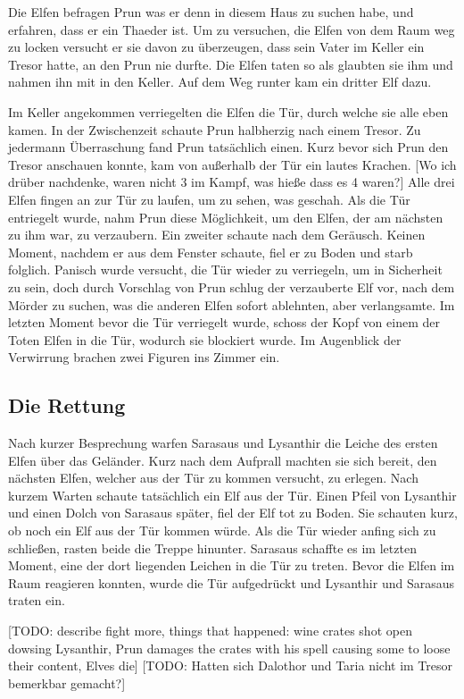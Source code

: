 \documentclass[10pt,twoside,twocolumn,openany]{book}
\begin{document}
	Die Elfen befragen Prun was er denn in diesem Haus zu suchen habe, und erfahren, dass er ein Thaeder ist. Um zu versuchen, die Elfen von dem Raum weg zu locken versucht er sie davon zu überzeugen, dass sein Vater im Keller ein Tresor hatte, an den Prun nie durfte. Die Elfen taten so als glaubten sie ihm und nahmen ihn mit in den Keller. Auf dem Weg runter kam ein dritter Elf dazu.
	
	Im Keller angekommen verriegelten die Elfen die Tür, durch welche sie alle eben kamen. In der Zwischenzeit schaute Prun halbherzig nach einem Tresor. Zu jedermann Überraschung fand Prun tatsächlich einen. Kurz bevor sich Prun den Tresor anschauen konnte, kam von außerhalb der Tür ein lautes Krachen. [Wo ich drüber nachdenke, waren nicht 3 im Kampf, was hieße dass es 4 waren?] Alle drei Elfen fingen an zur Tür zu laufen, um zu sehen, was geschah. Als die Tür entriegelt wurde, nahm Prun diese Möglichkeit, um den Elfen, der am nächsten zu ihm war, zu verzaubern. Ein zweiter schaute nach dem Geräusch. Keinen Moment, nachdem er aus dem Fenster schaute, fiel er zu Boden und starb folglich. Panisch wurde versucht, die Tür wieder zu verriegeln, um in Sicherheit zu sein, doch durch Vorschlag von Prun schlug der verzauberte Elf vor, nach dem Mörder zu suchen, was die anderen Elfen sofort ablehnten, aber verlangsamte. Im letzten Moment bevor die Tür verriegelt wurde, schoss der Kopf von einem der Toten Elfen in die Tür, wodurch sie blockiert wurde. Im Augenblick der Verwirrung brachen zwei Figuren ins Zimmer ein.
	
	\subsection{Die Rettung}
	
	Nach kurzer Besprechung warfen Sarasaus und Lysanthir die Leiche des ersten Elfen über das Geländer. Kurz nach dem Aufprall machten sie sich bereit, den nächsten Elfen, welcher aus der Tür zu kommen versucht, zu erlegen. Nach kurzem Warten schaute tatsächlich ein Elf aus der Tür. Einen Pfeil von Lysanthir und einen Dolch von Sarasaus später, fiel der Elf tot zu Boden. Sie schauten kurz, ob noch ein Elf aus der Tür kommen würde. Als die Tür wieder anfing sich zu schließen, rasten beide die Treppe hinunter. Sarasaus schaffte es im letzten Moment, eine der dort liegenden Leichen in die Tür zu treten. Bevor die Elfen im Raum reagieren konnten, wurde die Tür aufgedrückt und Lysanthir und Sarasaus traten ein.
	
	
	[TODO: describe fight more, things that happened: wine crates shot open dowsing Lysanthir, Prun damages the crates with his spell causing some to loose their content, Elves die]
	[TODO: Hatten sich Dalothor und Taria nicht im Tresor bemerkbar gemacht?]
	
\end{document}
